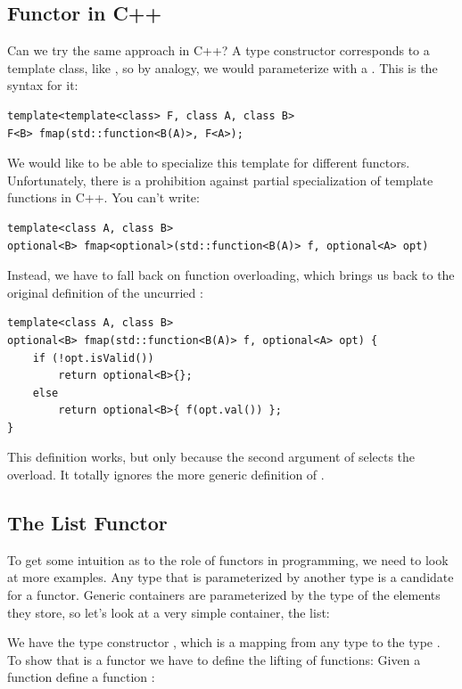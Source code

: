 \subsection{Functor in C++}

Can we try the same approach in C++? A type constructor corresponds to a
template class, like , so by analogy, we would
parameterize  with a 
. This is the syntax for it:

\begin{Verbatim}
template<template<class> F, class A, class B>
F<B> fmap(std::function<B(A)>, F<A>);
\end{Verbatim}
We would like to be able to specialize this template for different
functors. Unfortunately, there is a prohibition against partial
specialization of template functions in C++. You can't write:

\begin{Verbatim}
template<class A, class B>
optional<B> fmap<optional>(std::function<B(A)> f, optional<A> opt)
\end{Verbatim}
Instead, we have to fall back on function overloading, which brings us
back to the original definition of the uncurried :

\begin{Verbatim}
template<class A, class B>
optional<B> fmap(std::function<B(A)> f, optional<A> opt) { 
    if (!opt.isValid()) 
        return optional<B>{}; 
    else
        return optional<B>{ f(opt.val()) };
}
\end{Verbatim}
This definition works, but only because the second argument of
 selects the overload. It totally ignores the more generic
definition of .

\subsection{The List Functor}

To get some intuition as to the role of functors in programming, we need
to look at more examples. Any type that is parameterized by another type
is a candidate for a functor. Generic containers are parameterized by
the type of the elements they store, so let's look at a very simple
container, the list:

We have the type constructor , which is a mapping from any
type  to the type . To show that 
is a functor we have to define the lifting of functions: Given a
function  define a function
:

